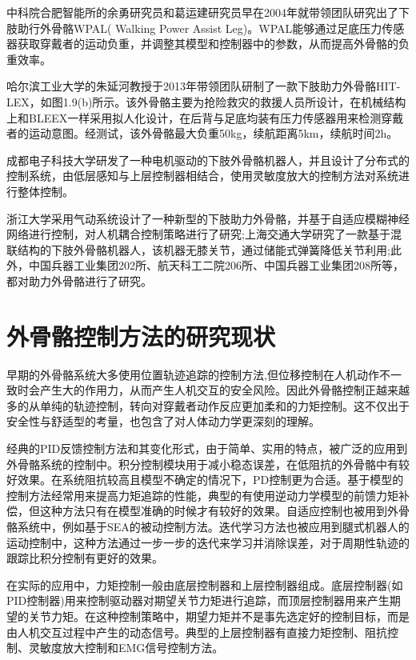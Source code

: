 中科院合肥智能所的余勇研究员和葛运建研究员早在2004年就带领团队研究出了下肢助行外骨骼WPAL\cite{p14}( Walking Power Assist Leg)。WPAL能够通过足底压力传感器获取穿戴者的运动负重，并调整其模型和控制器中的参数，从而提高外骨骼的负重效率\cite{p15}。

哈尔滨工业大学的朱延河教授于2013年带领团队研制了一款下肢助力外骨骼HIT-LEX\cite{p18}，如图1.9(b)所示。该外骨骼主要为抢险救灾的救援人员所设计，在机械结构上和BLEEX一样采用拟人化设计，在后背与足底均装有压力传感器用来检测穿戴者的运动意图。经测试，该外骨骼最大负重50kg，续航距离5km，续航时间2h。

成都电子科技大学研发了一种电机驱动的下肢外骨骼机器人，并且设计了分布式的控制系统，由低层感知与上层控制器相结合，使用灵敏度放大的控制方法对系统进行整体控制\cite{p19}。

浙江大学采用气动系统设计了一种新型的下肢助力外骨骼，并基于自适应模糊神经网络进行控制，对人机耦合控制策略进行了研究\cite{p17};上海交通大学研究了一款基于混联结构的下肢外骨骼机器人，该机器无膝关节，通过储能式弹簧降低关节利用\cite{p20};此外，中国兵器工业集团202所、航天科工二院206所、中国兵器工业集团208所等，都对助力外骨骼进行了研究。

\section{外骨骼控制方法的研究现状}

早期的外骨骼系统大多使用位置轨迹追踪的控制方法\cite{p21,p22},但位移控制在人机动作不一致时会产生大的作用力，从而产生人机交互的安全风险。因此外骨骼控制正越来越多的从单纯的轨迹控制，转向对穿戴者动作反应更加柔和的力矩控制。这不仅出于安全性与舒适型的考量，也包含了对人体动力学更深刻的理解\cite{p23,p24}。

经典的PID反馈控制方法和其变化形式，由于简单、实用的特点，被广泛的应用到外骨骼系统的控制中。积分控制模块用于减小稳态误差，在低阻抗的外骨骼中有较好效果\cite{p25}。在系统阻抗较高且模型不确定的情况下，PD控制更为合适\cite{p27,p28}。基于模型的控制方法经常用来提高力矩追踪的性能，典型的有使用逆动力学模型的前馈力矩补偿\cite{p29}，但这种方法只有在模型准确的时候才有较好的效果。自适应控制也被用到外骨骼系统中，例如基于SEA的被动控制方法\cite{p30}。迭代学习方法也被应用到腿式机器人的运动控制中\cite{p31}，这种方法通过一步一步的迭代来学习并消除误差，对于周期性轨迹的跟踪比积分控制有更好的效果。

在实际的应用中，力矩控制一般由底层控制器和上层控制器组成。底层控制器(如PID控制器)用来控制驱动器对期望关节力矩进行追踪，而顶层控制器用来产生期望的关节力矩。在这种控制策略中，期望力矩并不是事先选定好的控制目标，而是由人机交互过程中产生的动态信号。典型的上层控制器有直接力矩控制、阻抗控制、灵敏度放大控制和EMG信号控制方法。


